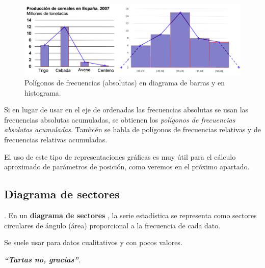\begin{example}

\begin{figure}[H]
			\centering
			\includegraphics[width=1\textwidth]{imagenes/imagenes01/T01IM05.png}
			\caption*{\footnotesize{Polígonos de frecuencias (absolutas) en diagrama de barras y en histograma.}}
		\end{figure}


Si en lugar de usar en el eje de ordenadas las frecuencias absolutas se usan las frecuencias absolutas acumuladas, se obtienen los \emph{polígonos de frecuencias absolutas acumuladas}. También se habla de polígonos de frecuencias relativas y de frecuencias relativas acumuladas. 

El uso de este tipo de representaciones gráficas es muy útil para el cálculo aproximado de parámetros de posición, como veremos en el próximo apartado. 

\end{example}

\vspace{2cm} %
\subsection{Diagrama de sectores}
\vspace{2cm} %
\begin{definition}
	. En un \textbf{diagrama de sectores	},  la serie estadística se representa como sectores circulares de ángulo (área) proporcional a la frecuencia de cada dato.
	
	\vspace{2mm} Se suele usar para datos cualitativos y con pocos valores.
\end{definition}


\vspace{4cm} %
\textbf{ \emph{``Tartas no, gracias''}}.

